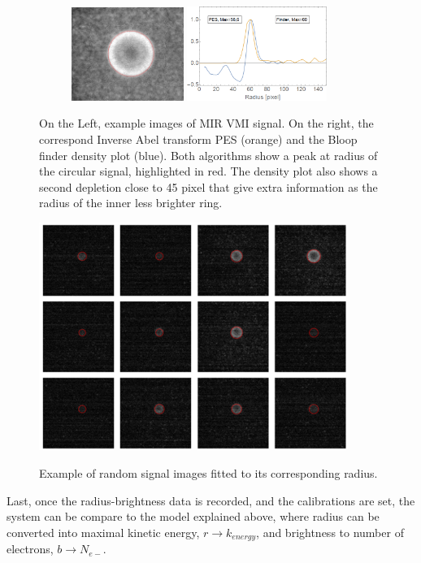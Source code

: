 \begin{figure}[hbtp!]
\centering
\begin{subfigure}[l]{1\textwidth}
\includegraphics[width=0.4\textwidth]{../Images/rawVMIfit.PNG} \includegraphics[width=0.5\textwidth]{../Images/pesandFinder.PNG} \end{subfigure} 
\caption[Fit-Abel transform agreement]{On the Left, example images of MIR VMI signal. On the right, the correspond Inverse Abel transform PES (orange) and the Bloop finder density plot (blue). Both algorithms show a peak at radius of the circular signal, highlighted in red. The density plot also shows a second depletion close to 45 pixel that give extra information as the radius of the inner less brighter ring. }
\label{fig:abelfinder}
\end{figure}


\begin{figure}[hbtp]
\caption[Example signal finder]{Example of random signal images fitted to its corresponding radius.}
\centering
\includegraphics[width=10cm]{../Images/density_plot_chekc.png}
\label{fig:checkradius}
\end{figure}
Last, once the radius-brightness data is recorded, and the calibrations are set, the system can be compare to the model explained above, where radius can be converted into maximal kinetic energy, $r\rightarrow k_{energy}$, and brightness to number of electrons, $b\rightarrow N_{e-}$. 


